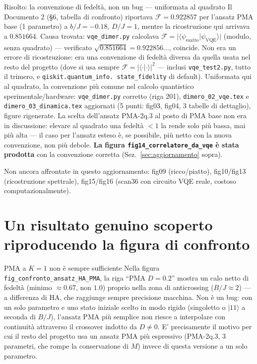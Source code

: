 \documentclass[11pt,a4paper]{article}
\newcommand{\ket}[1]{\lvert #1 \rangle}
\newcommand{\code}[1]{\texttt{\small #1}}
\begin{document}
\begin{okbox}{Risolto: la convenzione di fedeltà, non un bug --- uniformata al quadrato}
Il Documento 2 (\S6, tabella di confronto) riportava $\mathcal F=0.922857$
per l'ansatz PMA base (1 parametro) a $b/J=-0.18$, $D/J=1$, mentre la
ricostruzione qui arrivava a $0.851664$. Causa trovata: \code{vqe\_dimer.py}
calcolava $\mathcal F=\lvert\langle\psi_\text{esatto}\rvert\psi_\text{VQE}\rangle\rvert$
(modulo, senza quadrato) --- verificato $\sqrt{0.851664}=0.922856\ldots$,
coincide. Non era un errore di ricostruzione: era una convenzione di
fedeltà diversa da quella usata nel resto del progetto (dove si usa sempre
$\mathcal F=\lvert\langle\cdot\rvert\cdot\rangle\rvert^2$ --- inclusi
\code{vqe\_test2.py}, tutto il trimero, e \code{qiskit.quantum\_info.
state\_fidelity} di default). Uniformata qui al quadrato, la convenzione
più comune nel calcolo quantistico sperimentale/hardware: \code{vqe\_dimer.py}
corretto (riga 201), \code{dimero\_02\_vqe.tex} e \code{dimero\_03\_dinamica.tex}
aggiornati (5 punti: fig03, fig04, 3 tabelle di dettaglio), figure
rigenerate. La scelta dell'ansatz PMA-2q.3 al posto di PMA base non era in
discussione: elevare al quadrato una fedeltà $<1$ la rende solo più bassa,
mai più alta --- il caso per l'ansatz esteso è, se possibile, più netto con
la nuova convenzione, non più debole. \textbf{La figura
\code{fig14\_correlatore\_da\_vqe} è stata prodotta} con la convenzione
corretta (Sez.~\ref{sec:aggiornamento} sopra).
\end{okbox}

Non ancora affrontate in questo aggiornamento: fig09 (ricco/piatto),
fig10/fig13 (ricostruzione spettrale), fig15/fig16 (scan36 con circuito
VQE reale, costoso computazionalmente).

\section{Un risultato genuino scoperto riproducendo la figura di confronto}
\label{sec:pma-k1}

\begin{warnbox}{PMA a $K=1$ non è sempre sufficiente}
Nella figura \code{fig\_confronto\_ansatz\_HA\_PMA}, la riga ``PMA
$D=0.2$'' mostra un calo netto di fedeltà (minimo $\approx0.67$, non
$1.0$) proprio nella zona di anticrossing ($B/J\approx2$) --- a
differenza di HA, che raggiunge sempre precisione macchina. Non è un
bug: con un solo parametro e uno stato iniziale scelto in modo rigido
(singoletto o $\ket{11}$ a seconda di $B/J$), l'ansatz PMA più semplice
non riesce a interpolare con continuità attraverso il crossover indotto
da $D\neq0$. E' precisamente il motivo per cui il resto del progetto usa
un ansatz PMA più espressivo (PMA-2q.3, 3 parametri, che rompe la
conservazione di $M$) invece di questa versione a un solo parametro.
\end{warnbox}
\end{document}
